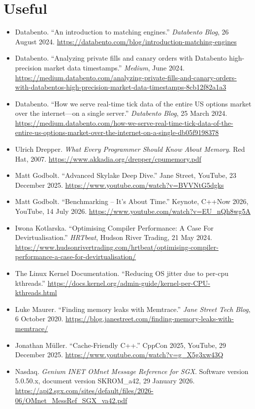 \documentclass{article}
\begin{document}
\section{Useful}
\begin{itemize}
	\item Databento. ``An introduction to matching engines.'' \textit{Databento Blog}, 26 August 2024. \url{https://databento.com/blog/introduction-matching-engines}
	\item Databento. ``Analyzing private fills and canary orders with Databento high-precision market data timestamps.'' \textit{Medium}, June 2024. \url{https://medium.databento.com/analyzing-private-fills-and-canary-orders-with-databentos-high-precision-market-data-timestamps-8cb12f82a1a3}
	\item Databento. ``How we serve real-time tick data of the entire US options market over the internet---on a single server.'' \textit{Databento Blog}, 25 March 2024. \url{https://medium.databento.com/how-we-serve-real-time-tick-data-of-the-entire-us-options-market-over-the-internet-on-a-single-db05f9198378}
	\item Ulrich Drepper. \textit{What Every Programmer Should Know About Memory}. Red Hat, 2007. \url{https://www.akkadia.org/drepper/cpumemory.pdf}
	\item Matt Godbolt. ``Advanced Skylake Deep Dive.'' Jane Street, YouTube, 23 December 2025. \url{https://www.youtube.com/watch?v=BVVNtG5dgks}
	\item Matt Godbolt. ``Benchmarking -- It's About Time.'' Keynote, C++Now 2026, YouTube, 14 July 2026. \url{https://www.youtube.com/watch?v=EU_nQh8wg5A}
	\item Iwona Kotlarska. ``Optimising Compiler Performance: A Case For Devirtualisation.'' \textit{HRTbeat}, Hudson River Trading, 21 May 2024. \url{https://www.hudsonrivertrading.com/hrtbeat/optimising-compiler-performance-a-case-for-devirtualisation/}
	\item The Linux Kernel Documentation. ``Reducing OS jitter due to per-cpu kthreads.'' \url{https://docs.kernel.org/admin-guide/kernel-per-CPU-kthreads.html}
	\item Luke Maurer. ``Finding memory leaks with Memtrace.'' \textit{Jane Street Tech Blog}, 6 October 2020. \url{https://blog.janestreet.com/finding-memory-leaks-with-memtrace/}
	\item Jonathan M\"uller. ``Cache-Friendly C++.'' CppCon 2025, YouTube, 29 December 2025. \url{https://www.youtube.com/watch?v=g_X5g3xw43Q}
	\item Nasdaq. \textit{Genium INET OMnet Message Reference for SGX}. Software version 5.0.50.x, document version SKROM\_a42, 29 January 2026. \url{https://api2.sgx.com/sites/default/files/2026-06/OMnet_MessRef_SGX_va42.pdf}

\end{itemize}
\end{document}
